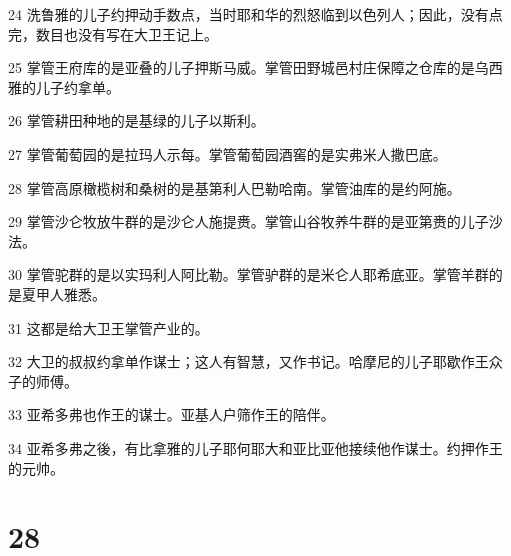 \par 24 洗鲁雅的儿子约押动手数点，当时耶和华的烈怒临到以色列人；因此，没有点完，数目也没有写在大卫王记上。
\par 25 掌管王府库的是亚叠的儿子押斯马威。掌管田野城邑村庄保障之仓库的是乌西雅的儿子约拿单。
\par 26 掌管耕田种地的是基绿的儿子以斯利。
\par 27 掌管葡萄园的是拉玛人示每。掌管葡萄园酒窖的是实弗米人撒巴底。
\par 28 掌管高原橄榄树和桑树的是基第利人巴勒哈南。掌管油库的是约阿施。
\par 29 掌管沙仑牧放牛群的是沙仑人施提赉。掌管山谷牧养牛群的是亚第赉的儿子沙法。
\par 30 掌管驼群的是以实玛利人阿比勒。掌管驴群的是米仑人耶希底亚。掌管羊群的是夏甲人雅悉。
\par 31 这都是给大卫王掌管产业的。
\par 32 大卫的叔叔约拿单作谋士；这人有智慧，又作书记。哈摩尼的儿子耶歇作王众子的师傅。
\par 33 亚希多弗也作王的谋士。亚基人户筛作王的陪伴。
\par 34 亚希多弗之後，有比拿雅的儿子耶何耶大和亚比亚他接续他作谋士。约押作王的元帅。

\chapter{28}

